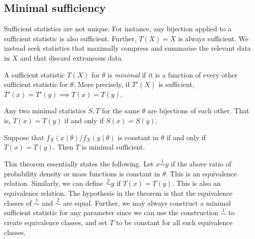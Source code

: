 \subsection{Minimal sufficiency}
Sufficient statistics are not unique.
For instance, any bijection applied to a sufficient statistic is also sufficient.
Further, \( T(X) = X \) is always sufficient.
We instead seek statistics that maximally compress and summarise the relevant data in \( X \) and that discard extraneous data.
\begin{definition}
	A sufficient statistic \( T(X) \) for \( \theta \) is \textit{minimal} if it is a function of every other sufficient statistic for \( \theta \).
	More precisely, if \( T'(X) \) is sufficient, \( T'(x) = T'(y) \implies T(x) = T(y) \).
\end{definition}
\begin{remark}
	Any two minimal statistics \( S, T \) for the same \( \theta \) are bijections of each other.
	That is, \( T(x) = T(y) \) if and only if \( S(x) = S(y) \).
\end{remark}
\begin{theorem}
	Suppose that \( f_X(x \mid \theta)/f_X(y \mid \theta) \) is constant in \( \theta \) if and only if \( T(x) = T(y) \).
	Then \( T \) is minimal sufficient.
\end{theorem}
\begin{remark}
	This theorem essentially states the following.
	Let \( x \overset{1}{\sim} y \) if the above ratio of probability density or mass functions is constant in \( \theta \).
	This is an equivalence relation.
	Similarly, we can define \( \overset{2}{\sim} y \) if \( T(x) = T(y) \).
	This is also an equivalence relation.
	The hypothesis in the theorem is that the equivalence classes of \( \overset{1}{\sim} \) and \( \overset{2}{\sim} \) are equal.
	Further, we may always construct a minimal sufficient statistic for any parameter since we can use the construction \( \overset{1}{\sim} \) to create equivalence classes, and set \( T \) to be constant for all such equivalence classes.
\end{remark}
